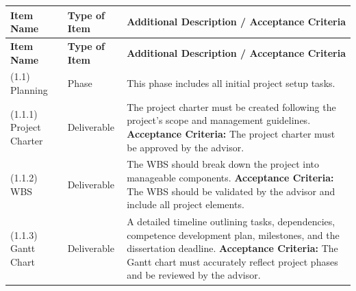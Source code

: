 \begin{longtable}{|p{3cm}|p{2.5cm}|p{8cm}|}
    \hline
    \textbf{Item Name}             & \textbf{Type of Item} & \textbf{Additional Description / Acceptance Criteria}                                                                                                                                                                                                                                                                                                     \\ \hline
    \endfirsthead
    \hline
    \textbf{Item Name}             & \textbf{Type of Item} & \textbf{Additional Description / Acceptance Criteria}                                                                                                                                                                                                                                                                                                     \\ \hline
    \endhead
    (1.1) Planning                 & Phase                 & This phase includes all initial project setup tasks.                                                                                                                                                                                                                                                                                                      \\ \hline
    (1.1.1) Project Charter        & Deliverable           & The project charter must be created following the project's scope and management guidelines. \newline \textbf{Acceptance Criteria:} The project charter must be approved by the advisor.                                                                                                                                                                  \\ \hline
    (1.1.2) \gls{WBS}              & Deliverable           & The \gls{WBS} should break down the project into manageable components. \newline \textbf{Acceptance Criteria:} The WBS should be validated by the advisor and include all project elements.                                                                                                                                                               \\ \hline
    (1.1.3) Gantt Chart            & Deliverable           & A detailed timeline outlining tasks, dependencies, competence development plan, milestones, and the dissertation deadline. \newline \textbf{Acceptance Criteria:} The Gantt chart must accurately reflect project phases and be reviewed by the advisor.                                                                                                  \\ \hline
    \hline 


\end{longtable}
